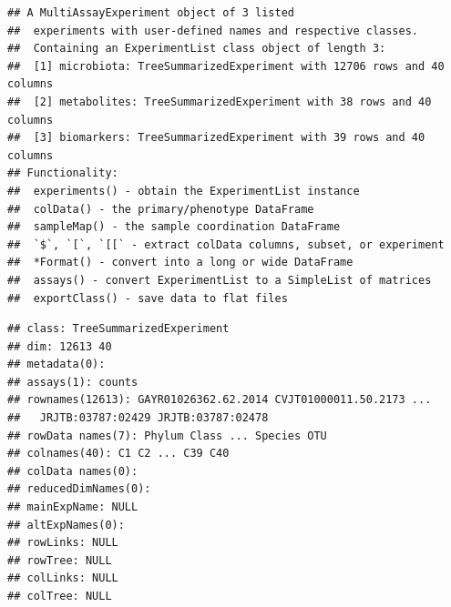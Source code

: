 \documentclass[
]{book}
\newenvironment{Shaded}{\begin{snugshade}}{\end{snugshade}}
\newcommand{\AttributeTok}[1]{\textcolor[rgb]{0.77,0.63,0.00}{#1}}
\newcommand{\CommentTok}[1]{\textcolor[rgb]{0.56,0.35,0.01}{\textit{#1}}}
\newcommand{\ControlFlowTok}[1]{\textcolor[rgb]{0.13,0.29,0.53}{\textbf{#1}}}
\newcommand{\DecValTok}[1]{\textcolor[rgb]{0.00,0.00,0.81}{#1}}
\newcommand{\FunctionTok}[1]{\textcolor[rgb]{0.00,0.00,0.00}{#1}}
\newcommand{\NormalTok}[1]{#1}
\newcommand{\OtherTok}[1]{\textcolor[rgb]{0.56,0.35,0.01}{#1}}
\newcommand{\SpecialCharTok}[1]{\textcolor[rgb]{0.00,0.00,0.00}{#1}}
\newcommand{\StringTok}[1]{\textcolor[rgb]{0.31,0.60,0.02}{#1}}
\begin{document}
\begin{verbatim}
## A MultiAssayExperiment object of 3 listed
##  experiments with user-defined names and respective classes.
##  Containing an ExperimentList class object of length 3:
##  [1] microbiota: TreeSummarizedExperiment with 12706 rows and 40 columns
##  [2] metabolites: TreeSummarizedExperiment with 38 rows and 40 columns
##  [3] biomarkers: TreeSummarizedExperiment with 39 rows and 40 columns
## Functionality:
##  experiments() - obtain the ExperimentList instance
##  colData() - the primary/phenotype DataFrame
##  sampleMap() - the sample coordination DataFrame
##  `$`, `[`, `[[` - extract colData columns, subset, or experiment
##  *Format() - convert into a long or wide DataFrame
##  assays() - convert ExperimentList to a SimpleList of matrices
##  exportClass() - save data to flat files
\end{verbatim}

\begin{Shaded}
\end{Shaded}

\begin{verbatim}
## class: TreeSummarizedExperiment 
## dim: 12613 40 
## metadata(0):
## assays(1): counts
## rownames(12613): GAYR01026362.62.2014 CVJT01000011.50.2173 ...
##   JRJTB:03787:02429 JRJTB:03787:02478
## rowData names(7): Phylum Class ... Species OTU
## colnames(40): C1 C2 ... C39 C40
## colData names(0):
## reducedDimNames(0):
## mainExpName: NULL
## altExpNames(0):
## rowLinks: NULL
## rowTree: NULL
## colLinks: NULL
## colTree: NULL
\end{verbatim}
\end{document}
